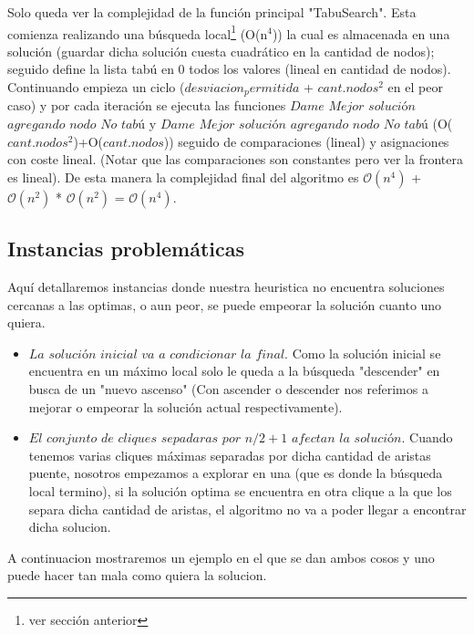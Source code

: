  Solo queda ver la complejidad de la función principal "TabuSearch". Esta comienza realizando una búsqueda local\footnote{ver sección anterior} (O(n$^{4}$)) la cual es almacenada en una solución (guardar dicha solución cuesta cuadrático en la cantidad de nodos); seguido define la lista tabú en 0 todos los valores (lineal en cantidad de nodos). Continuando empieza un ciclo ($desviacion_permitida$ + $cant.nodos$$^{2}$ en el peor caso) y por cada iteración se ejecuta las funciones $Dame$ $Mejor$ $solución$ $agregando$ $nodo$ $No$ $tabú$ y $Dame$ $Mejor$ $solución$ $agregando$ $nodo$ $No$ $tabú$ (O($cant.nodos$$^{2}$)+O($cant.nodos$)) seguido de comparaciones (lineal) y asignaciones con coste lineal. (Notar que las comparaciones son constantes pero ver la frontera es lineal). \newline
 De esta manera la complejidad final del algoritmo es $\mathcal{O}(n^{4})$ + $\mathcal{O}(n^{2})$ * $\mathcal{O}(n^{2})$ = $\mathcal{O}(n^{4})$.


\subsection{Instancias problemáticas}

 Aquí detallaremos instancias donde nuestra heuristica no encuentra soluciones cercanas a las optimas, o aun peor, se puede empeorar la solución cuanto uno quiera.

\begin{itemize}
 
  \item $La$ $solución$ $inicial$ $va$ $a$ $condicionar$ $la$ $final$. Como la solución inicial se encuentra en un máximo local solo le queda a la búsqueda "descender" en busca de un "nuevo ascenso" (Con ascender o descender nos referimos a mejorar o empeorar la solución actual respectivamente).


  \item $El$ $conjunto$ $de$ $cliques$ $sepadaras$ $por$ $n/2+1$ $afectan$ $la$ $solución$. Cuando tenemos varias cliques máximas separadas por dicha cantidad de aristas puente, nosotros empezamos a explorar en una (que es donde la búsqueda local termino), si la solución optima se encuentra en otra clique a la que los separa dicha cantidad de aristas, el algoritmo no va a poder llegar a encontrar dicha solucion. 

\end{itemize}

A continuacion mostraremos un ejemplo en el que se dan ambos cosos y uno puede hacer tan mala como quiera la solucion.

